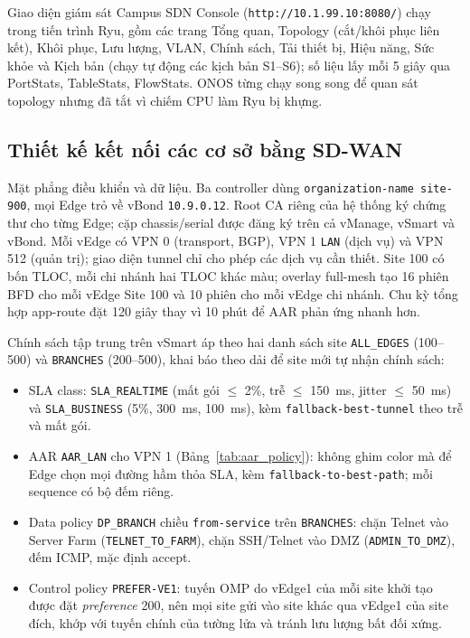 Giao diện giám sát Campus SDN Console (\texttt{http://10.1.99.10:8080/}) chạy trong tiến trình Ryu, gồm các trang Tổng quan, Topology (cắt/khôi phục liên kết), Khôi phục, Lưu lượng, VLAN, Chính sách, Tải thiết bị, Hiệu năng, Sức khỏe và Kịch bản (chạy tự động các kịch bản S1--S6); số liệu lấy mỗi 5 giây qua PortStats, TableStats, FlowStats. ONOS từng chạy song song để quan sát topology nhưng đã tắt vì chiếm CPU làm Ryu bị khựng.

\subsection{Thiết kế kết nối các cơ sở bằng SD-WAN}

Mặt phẳng điều khiển và dữ liệu. Ba controller dùng \texttt{organization-name site-900}, mọi Edge trỏ về vBond \texttt{10.9.0.12}. Root CA riêng của hệ thống ký chứng thư cho từng Edge; cặp chassis/serial được đăng ký trên cả vManage, vSmart và vBond. Mỗi vEdge có VPN 0 (transport, BGP), VPN 1 \texttt{LAN} (dịch vụ) và VPN 512 (quản trị); giao diện tunnel chỉ cho phép các dịch vụ cần thiết. Site 100 có bốn TLOC, mỗi chi nhánh hai TLOC khác màu; overlay full-mesh tạo 16 phiên BFD cho mỗi vEdge Site 100 và 10 phiên cho mỗi vEdge chi nhánh. Chu kỳ tổng hợp app-route đặt 120 giây thay vì 10 phút để AAR phản ứng nhanh hơn.

Chính sách tập trung trên vSmart áp theo hai danh sách site \texttt{ALL\_EDGES} (100--500) và \texttt{BRANCHES} (200--500), khai báo theo dải để site mới tự nhận chính sách:
\begin{itemize}
    \item SLA class: \texttt{SLA\_REALTIME} (mất gói $\le$ 2\%, trễ $\le$ 150~ms, jitter $\le$ 50~ms) và \texttt{SLA\_BUSINESS} (5\%, 300~ms, 100~ms), kèm \texttt{fallback-best-tunnel} theo trễ và mất gói.
    \item AAR \texttt{AAR\_LAN} cho VPN 1 (Bảng~\ref{tab:aar_policy}): không ghim color mà để Edge chọn mọi đường hầm thỏa SLA, kèm \texttt{fallback-to-best-path}; mỗi sequence có bộ đếm riêng.
    \item Data policy \texttt{DP\_BRANCH} chiều \texttt{from-service} trên \texttt{BRANCHES}: chặn Telnet vào Server Farm (\texttt{TELNET\_TO\_FARM}), chặn SSH/Telnet vào DMZ (\texttt{ADMIN\_TO\_DMZ}), đếm ICMP, mặc định accept.
    \item Control policy \texttt{PREFER-VE1}: tuyến OMP do vEdge1 của mỗi site khởi tạo được đặt \textit{preference} 200, nên mọi site gửi vào site khác qua vEdge1 của site đích, khớp với tuyến chính của tường lửa và tránh lưu lượng bất đối xứng.
\end{itemize}

